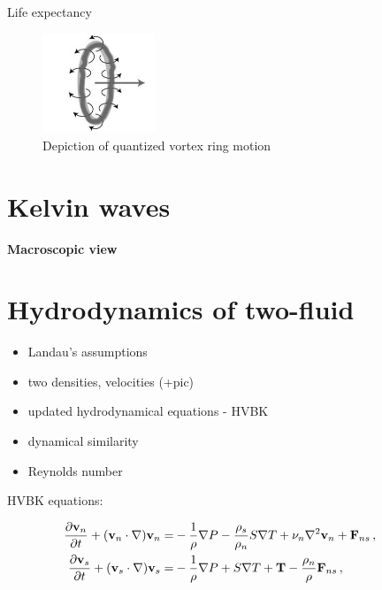\todo Life expectancy

\begin{figure}[h]
	\centering
	\includegraphics[width=0.3\textwidth]{graphics/theory/vortex-ring}
	\caption{Depiction of quantized vortex ring motion}
	\label{vortex-ring}
\end{figure}

\section{Kelvin waves}

\todo

\newpage

{\Huge \bfseries Macroscopic view}
\vspace{0.3cm}

\section{Hydrodynamics of two-fluid}
\begin{itemize}
	\item Landau's assumptions
	\item two densities, velocities (+pic)
	\item updated hydrodynamical equations - HVBK
	\item dynamical similarity
	\item Reynolds number
\end{itemize}

HVBK equations:

\begin{align}
\frac{\partial\vec{v}_n}{\partial t} + (\vec{v}_n\cdot \nabla)\vec{v}_n =& -\frac{1}{\rho} \nabla P - \frac{\rho_s}{\rho_n} S \nabla T + \nu_n \nabla^2 \vec{v}_n + \vec{F}_{ns}\,,
\label{motion_normal}\\
\frac{\partial\vec{v}_s}{\partial t} + (\vec{v}_s\cdot \nabla)\vec{v}_s =& -\frac{1}{\rho} \nabla P + S \nabla T + \vec{T} - \frac{\rho_n}{\rho} \vec{F}_{ns}\,,
\hspace{15mm}
\label{motion_super}
\end{align}

